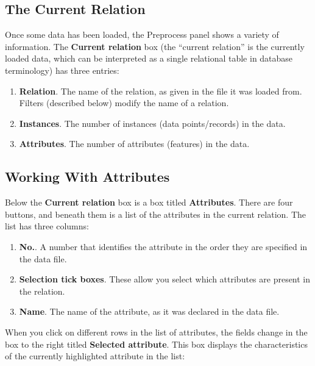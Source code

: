\documentclass[a4paper]{article}
\begin{document}
\subsection{The Current Relation}

Once some data has been loaded, the Preprocess panel shows a variety
of information.  The \textbf{Current relation} box (the ``current
relation'' is the currently loaded data, which can be interpreted as a
single relational table in database terminology)  has three entries:

\begin{enumerate}
\item \textbf{Relation}.
The name of the relation, as given in the file it was loaded from. Filters
(described below) modify the name of a relation. 
\item \textbf{Instances}.
The number of instances (data points/records) in the data.
\item \textbf{Attributes}.
The number of attributes (features) in the data.
\end{enumerate}

\subsection{Working With Attributes}

Below the \textbf{Current relation} box is a box titled \textbf{Attributes}.
There are four buttons, and beneath them is a list of the attributes in the
current relation. The list has three columns:

\begin{enumerate}
\item \textbf{No.}.
A number that identifies the attribute in the order they are specified in the
data file. 
\item \textbf{Selection tick boxes}.
These allow you select which attributes are present in the relation.
\item \textbf{Name}.
The name of the attribute, as it was declared in the data file.
\end{enumerate}

When you click on different rows in the list of attributes, the fields
change in the box to the right titled \textbf{Selected
attribute}. This box displays the characteristics of the currently
highlighted attribute in the list:
\end{document}
